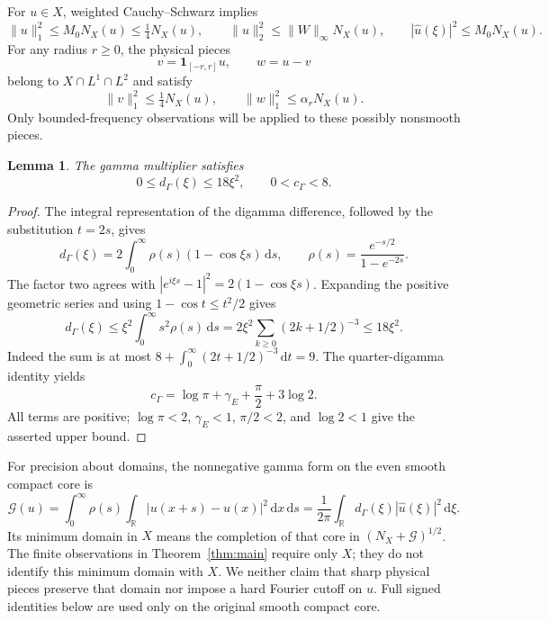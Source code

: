 \documentclass[11pt]{article}
\newtheorem{lemma}[theorem]{Lemma}
\theoremstyle{remark}\newtheorem{remark}[theorem]{Remark}
\newcommand{\R}{\mathbb R}
\newcommand{\dd}{\,\mathrm d}
\newcommand{\norm}[1]{\lVert #1\rVert}
\newcommand{\NX}{N_X}
\numberwithin{equation}{section}
\begin{document}
For $u\in X$, weighted Cauchy--Schwarz implies
\begin{equation}\label{eq:embeddings}
 \norm{u}_1^2\le M_0\NX(u)\le\tfrac14\NX(u),\qquad
 \norm{u}_2^2\le\norm{W}_\infty\NX(u),\qquad
 |\widehat u(\xi)|^2\le M_0\NX(u).
\end{equation}
For any radius $r\ge0$, the physical pieces
\begin{equation}\label{eq:split}
 v=\mathbf1_{[-r,r]}u,\qquad w=u-v
\end{equation}
belong to $X\cap L^1\cap L^2$ and satisfy
\begin{equation}\label{eq:splitL1}
 \norm{v}_1^2\le\tfrac14\NX(u),\qquad
 \norm{w}_1^2\le\alpha_r\NX(u).
\end{equation}
Only bounded-frequency observations will be applied to these possibly nonsmooth pieces.

\begin{lemma}\label{lem:gamma}
The gamma multiplier satisfies
\begin{equation}\label{eq:gammabounds}
 0\le d_\Gamma(\xi)\le18\xi^2,\qquad 0<c_\Gamma<8.
\end{equation}
\end{lemma}
\begin{proof}
The integral representation of the digamma difference, followed by the substitution $t=2s$, gives
\[
 d_\Gamma(\xi)=2\int_0^\infty\rho(s)(1-\cos\xi s)\dd s,
 \qquad \rho(s)=\frac{e^{-s/2}}{1-e^{-2s}}.
\]
The factor two agrees with $|e^{i\xi s}-1|^2=2(1-\cos\xi s)$. Expanding the positive geometric series and using $1-\cos t\le t^2/2$ gives
\[
 d_\Gamma(\xi)\le\xi^2\int_0^\infty s^2\rho(s)\dd s
 =2\xi^2\sum_{k\ge0}(2k+1/2)^{-3}\le18\xi^2.
\]
Indeed the sum is at most $8+\int_0^\infty(2t+1/2)^{-3}\dd t=9$.
The quarter-digamma identity yields
\[
 c_\Gamma=\log\pi+\gamma_E+\frac\pi2+3\log2.
\]
All terms are positive; $\log\pi<2$, $\gamma_E<1$, $\pi/2<2$, and $\log2<1$ give the asserted upper bound.
\end{proof}

For precision about domains, the nonnegative gamma form on the even smooth compact core is
\begin{equation}\label{eq:Gform}
 \mathcal G(u)=\int_0^\infty\rho(s)\int_\R|u(x+s)-u(x)|^2\dd x\dd s
 =\frac1{2\pi}\int_\R d_\Gamma(\xi)|\widehat u(\xi)|^2\dd\xi.
\end{equation}
Its minimum domain in $X$ means the completion of that core in $(\NX+\mathcal G)^{1/2}$. The finite observations in Theorem~\ref{thm:main} require only $X$; they do not identify this minimum domain with $X$. We neither claim that sharp physical pieces preserve that domain nor impose a hard Fourier cutoff on $u$. Full signed identities below are used only on the original smooth compact core.
\end{document}
